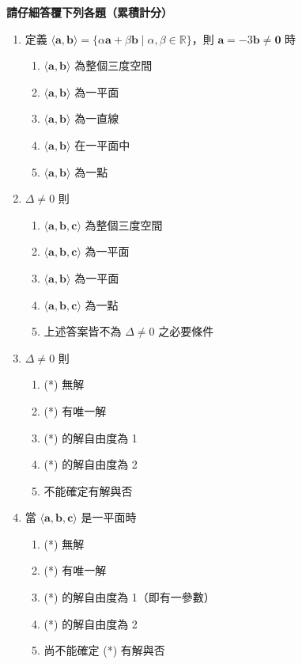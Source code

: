 \noindent\textbf{請仔細答覆下列各題（累積計分）}

\begin{enumerate}[label=(\arabic*), leftmargin=2em]
  \item 定義 $\langle \mathbf{a}, \mathbf{b} \rangle = \{\alpha\mathbf{a} + \beta\mathbf{b} \mid \alpha, \beta \in \mathbb{R}\}$，則 $\mathbf{a} = -3\mathbf{b} \neq \mathbf{0}$ 時
  \begin{enumerate}[label=\textcircled{\arabic*}, leftmargin=2em]
    \item $\langle \mathbf{a}, \mathbf{b} \rangle$ 為整個三度空間
    \item $\langle \mathbf{a}, \mathbf{b} \rangle$ 為一平面
    \item $\langle \mathbf{a}, \mathbf{b} \rangle$ 為一直線
    \item $\langle \mathbf{a}, \mathbf{b} \rangle$ 在一平面中
    \item $\langle \mathbf{a}, \mathbf{b} \rangle$ 為一點
  \end{enumerate}

  \item $\Delta \neq 0$ 則
  \begin{enumerate}[label=\textcircled{\arabic*}, leftmargin=2em]
    \item $\langle \mathbf{a}, \mathbf{b}, \mathbf{c} \rangle$ 為整個三度空間
    \item $\langle \mathbf{a}, \mathbf{b}, \mathbf{c} \rangle$ 為一平面
    \item $\langle \mathbf{a}, \mathbf{b} \rangle$ 為一平面
    \item $\langle \mathbf{a}, \mathbf{b}, \mathbf{c} \rangle$ 為一點
    \item 上述答案皆不為 $\Delta \neq 0$ 之必要條件
  \end{enumerate}

  \item $\Delta \neq 0$ 則
  \begin{enumerate}[label=\textcircled{\arabic*}, leftmargin=2em]
    \item (*) 無解
    \item (*) 有唯一解
    \item (*) 的解自由度為 1
    \item (*) 的解自由度為 2
    \item 不能確定有解與否
  \end{enumerate}

  \item 當 $\langle \mathbf{a}, \mathbf{b}, \mathbf{c} \rangle$ 是一平面時
  \begin{enumerate}[label=\textcircled{\arabic*}, leftmargin=2em]
    \item (*) 無解
    \item (*) 有唯一解
    \item (*) 的解自由度為 1（即有一參數）
    \item (*) 的解自由度為 2
    \item 尚不能確定 (*) 有解與否
  \end{enumerate}


\end{enumerate}
